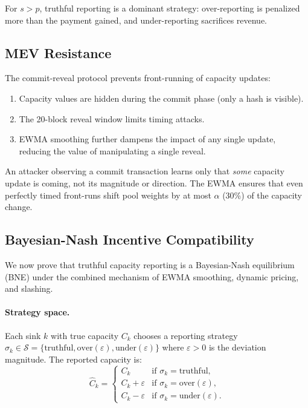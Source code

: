 For $s > p$, truthful reporting is a dominant strategy: over-reporting is penalized
more than the payment gained, and under-reporting sacrifices revenue.

\subsection{MEV Resistance}

The commit-reveal protocol prevents front-running of capacity updates:

\begin{enumerate}
    \item Capacity values are hidden during the commit phase (only a hash is visible).
    \item The 20-block reveal window limits timing attacks.
    \item EWMA smoothing further dampens the impact of any single update, reducing
          the value of manipulating a single reveal.
\end{enumerate}

An attacker observing a commit transaction learns only that \emph{some} capacity
update is coming, not its magnitude or direction. The EWMA ensures that even perfectly
timed front-runs shift pool weights by at most $\alpha$ (30\%) of the capacity change.

\subsection{Bayesian-Nash Incentive Compatibility}

We now prove that truthful capacity reporting is a Bayesian-Nash equilibrium (BNE)
under the combined mechanism of EWMA smoothing, dynamic pricing, and slashing.

\paragraph{Strategy space.}
Each sink $k$ with true capacity $C_k$ chooses a reporting strategy
$\sigma_k \in \mathcal{S} = \{\text{truthful}, \text{over}(\varepsilon),
\text{under}(\varepsilon)\}$ where $\varepsilon > 0$ is the deviation magnitude.
The reported capacity is:
\begin{equation}
\hat{C}_k =
\begin{cases}
C_k & \text{if } \sigma_k = \text{truthful}, \\
C_k + \varepsilon & \text{if } \sigma_k = \text{over}(\varepsilon), \\
C_k - \varepsilon & \text{if } \sigma_k = \text{under}(\varepsilon).
\end{cases}
\end{equation}


